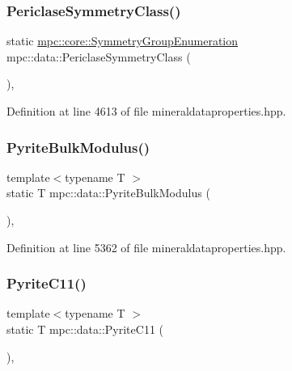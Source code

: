 \subsubsection{\texorpdfstring{Periclase\+Symmetry\+Class()}{PericlaseSymmetryClass()}}
{\footnotesize\ttfamily static \mbox{\hyperlink{namespacempc_1_1core_a9d979684062547055a0ef5c13077bad8}{mpc\+::core\+::\+Symmetry\+Group\+Enumeration}} mpc\+::data\+::\+Periclase\+Symmetry\+Class (\begin{DoxyParamCaption}{ }\end{DoxyParamCaption})\hspace{0.3cm}{\ttfamily [inline]}, {\ttfamily [static]}}



Definition at line 4613 of file mineraldataproperties.\+hpp.

\mbox{\label{namespacempc_1_1data_a244b9ff47f7a4c4cb81c34fa5e6f3111}} 
\subsubsection{\texorpdfstring{Pyrite\+Bulk\+Modulus()}{PyriteBulkModulus()}}
{\footnotesize\ttfamily template$<$typename T $>$ \\
static T mpc\+::data\+::\+Pyrite\+Bulk\+Modulus (\begin{DoxyParamCaption}{ }\end{DoxyParamCaption})\hspace{0.3cm}{\ttfamily [inline]}, {\ttfamily [static]}}



Definition at line 5362 of file mineraldataproperties.\+hpp.

\mbox{\label{namespacempc_1_1data_a00d8283e3281c5ba81e78ffc8421ad96}} 
\subsubsection{\texorpdfstring{Pyrite\+C11()}{PyriteC11()}}
{\footnotesize\ttfamily template$<$typename T $>$ \\
static T mpc\+::data\+::\+Pyrite\+C11 (\begin{DoxyParamCaption}{ }\end{DoxyParamCaption})\hspace{0.3cm}{\ttfamily [inline]}, {\ttfamily [static]}}



